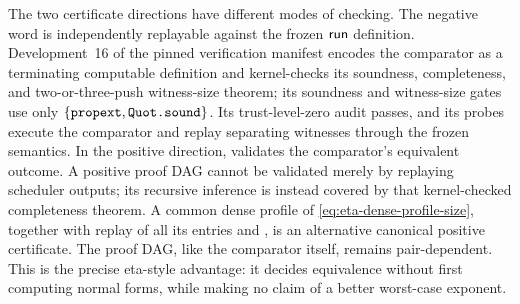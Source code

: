 The two certificate directions have different modes of checking.  The negative
word is independently replayable against the frozen \(\mathsf{run}\) definition.
Development~16 of the pinned verification manifest encodes the comparator as a
terminating computable definition and kernel-checks its soundness,
completeness, and two-or-three-push witness-size theorem; its soundness and
witness-size gates use only \(\{\texttt{propext},\texttt{Quot.sound}\}\).  Its
trust-level-zero audit passes, and its  probes execute the
comparator and replay separating witnesses through the frozen semantics.  In
the positive direction,  validates the comparator's
equivalent outcome.  A positive proof DAG cannot be validated merely by
replaying scheduler outputs; its recursive inference is instead covered by
that kernel-checked completeness theorem.  A common dense profile of
\autoref{eq:eta-dense-profile-size}, together with replay of all its entries and
, is an alternative canonical positive
certificate.  The proof DAG, like the comparator itself, remains pair-dependent.
This is the precise eta-style advantage: it decides
equivalence without first computing normal forms, while making no claim of a
better worst-case exponent.
